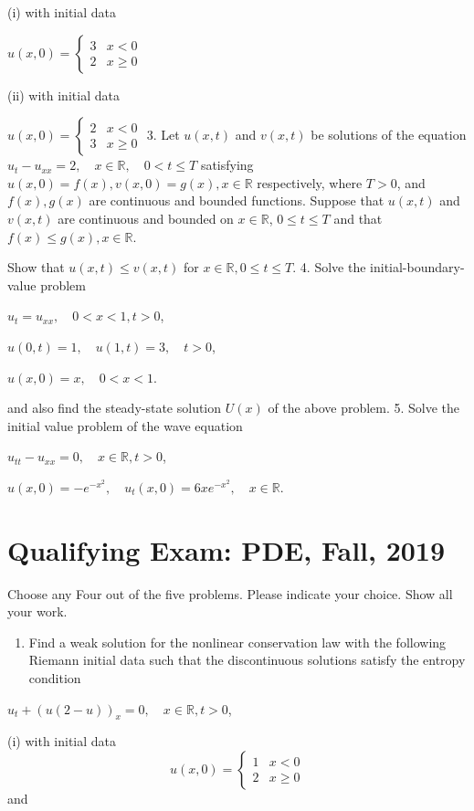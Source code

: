 \documentclass[10pt]{article}
\begin{document}
(i) with initial data

$u(x, 0)= \begin{cases}3 & x<0 \\ 2 & x \geq 0\end{cases}$

(ii) with initial data

$u(x, 0)= \begin{cases}2 & x<0 \\ 3 & x \geq 0\end{cases}$ 3. Let $u(x, t)$ and $v(x, t)$ be solutions of the equation $u_{t}-u_{x x}=2, \quad x \in \mathbb{R}, \quad 0<t \leq T$ satisfying $u(x, 0)=f(x), v(x, 0)=g(x), x \in \mathbb{R}$ respectively, where $T>0$, and $f(x), g(x)$ are continuous and bounded functions. Suppose that $u(x, t)$ and $v(x, t)$ are continuous and bounded on $x \in \mathbb{R}$, $0 \leq t \leq T$ and that $f(x) \leq g(x), x \in \mathbb{R} .$

Show that $u(x, t) \leq v(x, t)$ for $x \in \mathbb{R}, 0 \leq t \leq T$. 4. Solve the initial-boundary-value problem

$u_{t}=u_{x x}, \quad 0<x<1, t>0$,

$u(0, t)=1, \quad u(1, t)=3, \quad t>0$,

$u(x, 0)=x, \quad 0<x<1 .$

and also find the steady-state solution $U(x)$ of the above problem. 5. Solve the initial value problem of the wave equation

$u_{t t}-u_{x x}=0, \quad x \in \mathbb{R}, t>0$,

$u(x, 0)=-e^{-x^{2}}, \quad u_{t}(x, 0)=6 x e^{-x^{2}}, \quad x \in \mathbb{R}$.

\section{Qualifying Exam: PDE, Fall, 2019}
Choose any Four out of the five problems. Please indicate your choice. Show all your work.

\begin{enumerate}
  \item Find a weak solution for the nonlinear conservation law with the following Riemann initial data such that the discontinuous solutions satisfy the entropy condition
\end{enumerate}
$u_{t}+(u(2-u))_{x}=0, \quad x \in \mathbb{R}, t>0$,

(i) with initial data
$$
u(x, 0)= \begin{cases}1 & x<0 \\ 2 & x \geq 0\end{cases}
$$
and
\end{document}
